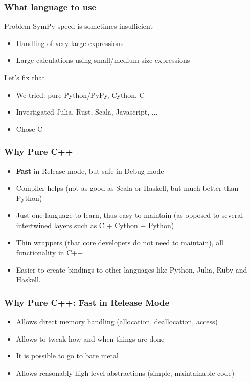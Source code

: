 \documentclass{beamer}
\begin{document}
\begin{frame}
\frametitle{What language to use}
\begin{block}{Problem}
SymPy speed is sometimes insufficient
\begin{itemize}
\item Handling of very large expressions
\item Large calculations using small/medium size expressions
\end{itemize}
\end{block}

\begin{block}{Let's fix that}
\begin{itemize}
\item We tried: pure Python/PyPy, Cython, C
\item Investigated Julia, Rust, Scala, Javascript, ...
\item Chose C++
\end{itemize}
\end{block}
\end{frame}


\begin{frame}
\frametitle{Why Pure C++}
\begin{itemize}
\item \textbf{Fast} in Release mode, but safe in Debug mode
\item Compiler helps (not as good as Scala or Haskell, but much better than
    Python)
\item Just one language to learn, thus easy to maintain (as opposed to several
    intertwined layers such as C + Cython + Python)
\item Thin wrappers (that core developers do not need to maintain), all functionality in C++
\item Easier to create bindings to other languages like Python, Julia, Ruby and Haskell.
\end{itemize}
\end{frame}

\begin{frame}
\frametitle{Why Pure C++: Fast in Release Mode}
\begin{itemize}
    \item Allows direct memory handling (allocation, deallocation, access)
    \item Allows to tweak how and when things are done
    \item It is possible to go to bare metal
    \item Allows reasonably high level abstractions (simple, maintainable
        code)
\end{itemize}
\end{frame}
\end{document}
